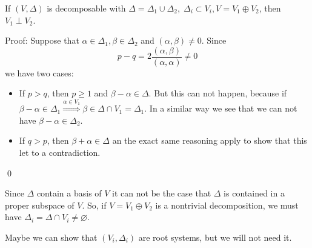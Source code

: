 \begin{dang}
    \begin{lemma}
        If $(V,\Delta)$ is decomposable with $\Delta=\Delta_1\cup\Delta_2,\;\Delta_i\subset V_i, V=V_1\oplus V_2$, 
        then $V_1\perp V_2$.
    \end{lemma}
\end{dang}
Proof: Suppose that $\alpha\in \Delta_1,\beta\in \Delta_2$ and $(\alpha,\beta)\neq0$. Since 
\begin{equation}
    p-q=2\frac{(\alpha,\beta)}{(\alpha,\alpha)}\neq0
\end{equation}
we have two cases:
\begin{itemize}
    \item If $p >q$, then $p\geq1$ and $\beta-\alpha\in \Delta$. But this can not happen, because if 
    $\beta-\alpha\in\Delta_1\overset{\alpha\in V_1}{\Rightarrow}\beta\in \Delta\cap V_1=\Delta_1$. 
    In a similar way we see that we 
    can not have $\beta-\alpha\in\Delta_2$.
    \item If $q>p$, then $\beta+\alpha\in\Delta$ an the exact same reasoning apply to show that this let to a contradiction.
\end{itemize}
\qed

\begin{dang}
    \begin{remark}
        Since $\Delta$ contain a basis of $V$ it can not be the case that $\Delta$ is contained in a proper subspace of $V$. 
        So, if $V=V_1\oplus V_2$ is a nontrivial decomposition, we must have $\Delta_i=\Delta\cap V_i\neq\varnothing$. 
    \end{remark}
\end{dang}

\begin{dang}
    \begin{remark}
        Maybe we can show that $(V_i,\Delta_i)$ are root systems, but we will not need it.
    \end{remark}
\end{dang}


